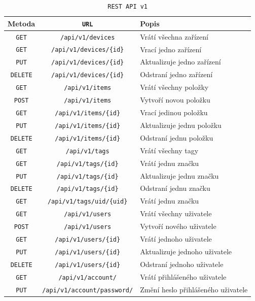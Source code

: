\documentclass[czech,BP]{thesiskiv}
\begin{document}
\begin{table}[H]
\centering
\begin{tabular}{ c | c | p{6cm}}
\textbf{Metoda} & \textbf{ \texttt{URL}} & \textbf{Popis} \\ \hline\hline
 	
\texttt{GET} & \texttt{/api/v1/devices} & Vrátí všechna zařízení \\ \hline  
\texttt{GET} & \texttt{/api/v1/devices/\{id\}} & Vrací jedno zařízení \\ \hline
\texttt{PUT} & \texttt{/api/v1/devices/\{id\}} & Aktualizuje jedno zařízení \\ \hline
\texttt{DELETE} & \texttt{/api/v1/devices/\{id\}} & Odstraní jedno zařízení  \\ \hline

\texttt{GET} & \texttt{/api/v1/items} & Vrátí všechny položky \\ \hline
\texttt{POST} & \texttt{/api/v1/items} & Vytvoří novou položku \\ \hline
\texttt{GET} & \texttt{/api/v1/items/\{id\}} & Vrací jedinou položku \\ \hline
\texttt{PUT} & \texttt{/api/v1/items/\{id\}} & Aktualizuje jednu položku \\ \hline
\texttt{DELETE} & \texttt{/api/v1/items/\{id\}} & Odstraní jednu položku \\ \hline

\texttt{GET} & \texttt{/api/v1/tags} & Vrátí všechny tagy  \\ \hline
\texttt{GET} & \texttt{/api/v1/tags/\{id\}} & Vrátí jednu značku \\ \hline
\texttt{PUT} & \texttt{/api/v1/tags/\{id\}} & Aktualizuje jednu značku \\ \hline
\texttt{DELETE} & \texttt{/api/v1/tags/\{id\}} & Odstraní jednu značku \\ \hline
\texttt{GET} & \texttt{/api/v1/tags/uid/\{uid\}} & Vrátí jednu značku \\ \hline

\texttt{GET} & \texttt{/api/v1/users} & Vrátí všechny uživatele \\ \hline
\texttt{POST} & \texttt{/api/v1/users} & Vytvoří nového uživatele \\ \hline
\texttt{GET} & \texttt{/api/v1/users/\{id\}} & Vrátí jednoho uživatele \\ \hline
\texttt{PUT} & \texttt{/api/v1/users/\{id\}} & Aktualizuje jednoho uživatele \\ \hline
\texttt{DELETE} & \texttt{/api/v1/users/\{id\}} & Odstraní jednoho uživatele \\ \hline

\texttt{GET} & \texttt{/api/v1/account/} & Vrátí přihlášeného uživatele  \\ \hline
\texttt{PUT} & \texttt{/api/v1/account/password/} & Změní heslo přihlášeného uživatele \\ \hline    
\end{tabular}
\caption{\texttt{REST API v1}}
\label{table:api}
\end{table}
\end{document}
